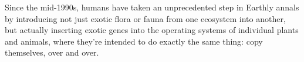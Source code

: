 Since the mid-1990s, humans have taken an unprecedented step in Earthly
annals by introducing not just exotic flora or fauna from one ecosystem
into another, but actually inserting exotic genes into the operating
systems of individual plants and animals, where they're intended to do
exactly the same thing: copy themselves, over and over.
